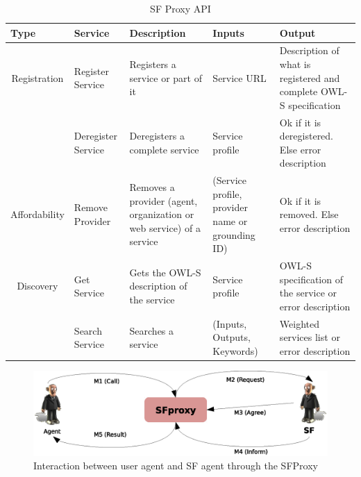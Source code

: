 \begin{table}[h!t]
\begin{center}
\begin{tabular}{|l|p{1.75cm}||p{2.5cm}|p{2.5cm}|p{3.5cm}|}
\hline
\textbf{Type} & \textbf{Service} & \textbf{Description} & \textbf{Inputs} & \textbf{Output} \\ \hline \hline

\multicolumn{ 1}{|c|}{Registration} & Register Service & Registers a service or part of it & Service URL & Description of what is registered and complete OWL-S specification \\ \hline

\multicolumn{ 1}{|c|}{} & Deregister Service & Deregisters a complete service & Service profile & Ok if it is deregistered. Else error description\\ \hline \hline

\multicolumn{1}{|c|}{Affordability} & Remove Provider & Removes a provider (agent, organization or web service) of a service  & (Service profile, provider name or grounding ID) & Ok if it is removed. Else error description \\ \hline \hline

\multicolumn{ 1}{|c|}{Discovery} & Get Service & Gets the OWL-S description of the service & Service profile & OWL-S specification of the service or error description \\ \hline

\multicolumn{ 1}{|c|}{} & Search Service & Searches a service & (Inputs, Outputs, Keywords) & Weighted services list or error description \\ \hline
\end{tabular}
\end{center}
\caption{SF Proxy API}
\label{tab:thomas_sf_services}
\end{table}



\begin{figure}[h!t]
	\centering
	\includegraphics[width=1.0\textwidth]{Thomas/images/sf_sfProxy_interaction}
	\caption{Interaction between user agent and SF agent through the SFProxy}
\end{figure}


